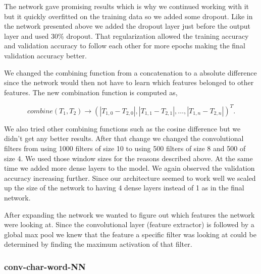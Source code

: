 The network gave promising results which is why we continued working with it but
it quickly overfitted on the training data so we added some dropout. Like in
the network presented above we added the dropout layer just before the output
layer and used 30\% dropout. That regularization allowed the training accuracy
and validation accuracy to follow each other for more epochs making the final
validation accuracy better.

We changed the combining function from a concatenation to a absolute difference
since the network would then not have to learn which features belonged to other
features. The new combination function is computed as,

\begin{equation}
    combine(T_1, T_2) \rightarrow \left(
        |T_{1,0} - T_{2,0}|, |T_{1,1} - T_{2,1}|, \dots, |T_{1,n} - T_{2,n}|
    \right)^T.
\end{equation}

We also tried other combining functions such as the cosine difference but we
didn't get any better results. After that change we changed the convolutional
filters from using 1000 filters of size 10 to using 500 filters of size 8 and
500 of size 4. We used those window sizes for the reasons described above. At
the same time we added more dense layers to the model. We again observed the
validation accuracy increasing further. Since our architecture seemed to work
well we scaled up the size of the network to having 4 dense layers instead of
1 as in the final network.

After expanding the network we wanted to figure out which features the network
were looking at. Since the convolutional layer (feature extractor) is followed
by a global max pool we knew that the feature a specific filter was looking at
could be determined by finding the maximum activation of that filter.


\subsubsection{\glsdesc{conv-char-word-NN}}
\label{subsubsec:conv_char_word_nn}


